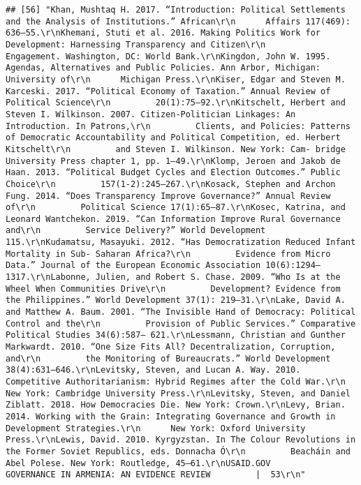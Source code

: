 \documentclass[
]{article}
\begin{document}
\begin{verbatim}
## [56] "Khan, Mushtaq H. 2017. “Introduction: Political Settlements and the Analysis of Institutions.” African\r\n      Affairs 117(469): 636–55.\r\nKhemani, Stuti et al. 2016. Making Politics Work for Development: Harnessing Transparency and Citizen\r\n         Engagement. Washington, DC: World Bank.\r\nKingdon, John W. 1995. Agendas, Alternatives and Public Policies. Ann Arbor, Michigan: University of\r\n      Michigan Press.\r\nKiser, Edgar and Steven M. Karceski. 2017. “Political Economy of Taxation.” Annual Review of Political Science\r\n         20(1):75–92.\r\nKitschelt, Herbert and Steven I. Wilkinson. 2007. Citizen-Politician Linkages: An Introduction. In Patrons,\r\n         Clients, and Policies: Patterns of Democratic Accountability and Political Competition, ed. Herbert Kitschelt\r\n         and Steven I. Wilkinson. New York: Cam- bridge University Press chapter 1, pp. 1–49.\r\nKlomp, Jeroen and Jakob de Haan. 2013. “Political Budget Cycles and Election Outcomes.” Public Choice\r\n         157(1-2):245–267.\r\nKosack, Stephen and Archon Fung. 2014. “Does Transparency Improve Governance?” Annual Review of\r\n         Political Science 17(1):65–87.\r\nKosec, Katrina, and Leonard Wantchekon. 2019. “Can Information Improve Rural Governance and\r\n         Service Delivery?” World Development 115.\r\nKudamatsu, Masayuki. 2012. “Has Democratization Reduced Infant Mortality in Sub- Saharan Africa?\r\n         Evidence from Micro Data.” Journal of the European Economic Association 10(6):1294–1317.\r\nLabonne, Julien, and Robert S. Chase. 2009. “Who Is at the Wheel When Communities Drive\r\n         Development? Evidence from the Philippines.” World Development 37(1): 219–31.\r\nLake, David A. and Matthew A. Baum. 2001. “The Invisible Hand of Democracy: Political Control and the\r\n         Provision of Public Services.” Comparative Political Studies 34(6):587– 621.\r\nLessmann, Christian and Gunther Markwardt. 2010. “One Size Fits All? Decentralization, Corruption, and\r\n         the Monitoring of Bureaucrats.” World Development 38(4):631–646.\r\nLevitsky, Steven, and Lucan A. Way. 2010. Competitive Authoritarianism: Hybrid Regimes after the Cold War.\r\n         New York: Cambridge University Press.\r\nLevitsky, Steven, and Daniel Ziblatt. 2018. How Democracies Die. New York: Crown.\r\nLevy, Brian. 2014. Working with the Grain: Integrating Governance and Growth in Development Strategies.\r\n      New York: Oxford University Press.\r\nLewis, David. 2010. Kyrgyzstan. In The Colour Revolutions in the Former Soviet Republics, eds. Donnacha Ó\r\n         Beacháin and Abel Polese. New York: Routledge, 45–61.\r\nUSAID.GOV                                                      GOVERNANCE IN ARMENIA: AN EVIDENCE REVIEW         |  53\r\n"                                                                                                                                                                                                                                                                                                                                                                                                                                                                                                                                                       
\end{verbatim}
\end{document}
